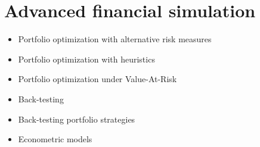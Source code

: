 \chapter{Advanced financial simulation}
\begin{itemize}
    \setlength\itemsep{0em}
    \item Portfolio optimization with alternative risk measures
    \item Portfolio optimization with heuristics
    \item Portfolio optimization under Value-At-Risk   
    \item Back-testing 
    \item Back-testing portfolio strategies
    \item Econometric models
\end{itemize}